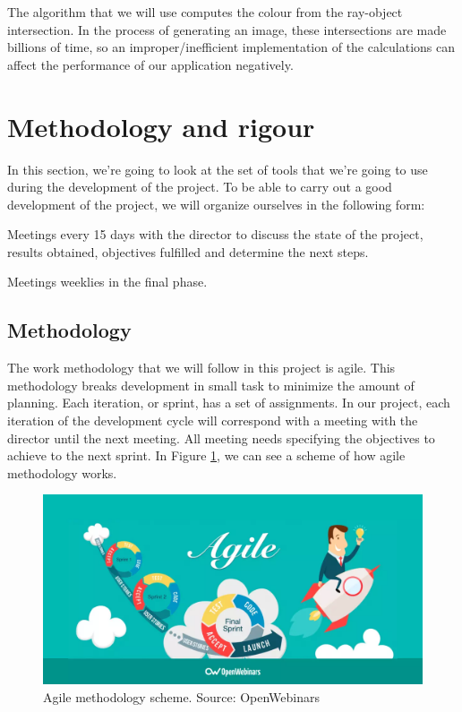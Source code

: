 \documentclass[titlepage,12pt]{report}
\begin{document}
The algorithm that we will use computes the colour from the ray-object intersection. In the process of generating an image, these intersections are made billions of time, so an improper/inefficient implementation of the calculations can affect the performance of our application negatively.

\section{Methodology and rigour}

In this section, we're going to look at the set of tools that we're going to use during the development of the project. To be able to carry out a good development of the project, we will organize ourselves in the following form: \begin{enumerate*}[label=\roman*)] \item Meetings every 15 days with the director to discuss the state of the project, results obtained, objectives fulfilled and determine the next steps. \item Meetings weeklies in the final phase. \end{enumerate*}

\subsection{Methodology}

The work methodology that we will follow in this project is agile. This methodology breaks development in small task to minimize the amount of planning. Each iteration, or sprint, has a set of assignments. In our project, each iteration of the development cycle will correspond with a meeting with the director until the next meeting. All meeting needs specifying the objectives to achieve to the next sprint. In Figure \ref{agile}, we can see a scheme of how agile methodology works.

\begin{figure}[ht]
	\centering
	\includegraphics[scale=0.25]{media/agile.png}
	\caption{Agile methodology scheme. Source: OpenWebinars}
	\label{agile}
\end{figure}
\end{document}
